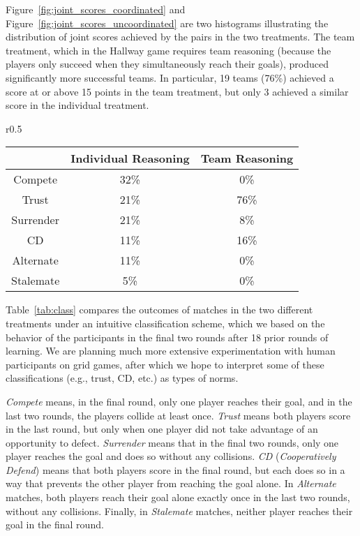 
Figure~\ref{fig:joint_scores_coordinated} and 
Figure~\ref{fig:joint_scores_uncoordinated} are two histograms illustrating the
distribution of joint scores achieved by the pairs in the two
treatments.  The team treatment, which in the Hallway game requires
team reasoning (because the players only succeed when they
simultaneously reach their goals), produced significantly more
successful teams.
%
In particular, 19 teams (76\%) achieved a score at or above 15 points
in the team treatment, but only 3 achieved a similar score in the
individual treatment.

\begin{wraptable}{r}{0.5\textwidth}
\begin{center}
\small{
\begin{tabular}{|c|c|c|}									   
\hline
			& Individual Reasoning              & Team Reasoning 	\\ \hline
 Compete		& 32\% 					& 0\% 			\\ \hline
 Trust		& 21\% 					& 76\% 			\\ \hline
 Surrender	& 21\% 					& 8\% 			\\ \hline
 CD			& 11\% 					& 16\% 			\\ \hline
 Alternate		& 11\% 					& 0\% 			\\ \hline
 Stalemate	& 5\% 					& 0\% 			\\ \hline
\end{tabular}}
\caption{A comparison between the strategies learned by pairs in the two treatments. 
These percentages represent $19$ games in the individual reasoning experiment,
and $25$ games in the team reasoning experiment.}
\label{tab:class}
\end{center}
\end{wraptable}

Table~\ref{tab:class} compares the outcomes of matches in the two
different treatments under an intuitive classification scheme, which
we based on the behavior of the participants in the final two rounds
after 18 prior rounds of learning.  We are planning much more
extensive experimentation with human participants on grid games, after
which we hope to interpret some of these classifications
(e.g., trust, CD, etc.) as types of norms.

\emph{Compete\/} means, in the final round, only one player reaches
their goal, and in the last two rounds, the players collide at least
once.  \emph{Trust\/} means both players score in the last round, but
only when one player did not take advantage of an opportunity to
defect.  \emph{Surrender\/} means that in the final two rounds, only
one player reaches the goal and does so without any collisions.
\emph{CD} (\emph{Cooperatively Defend}) means that both players score
in the final round, but each does so in a way that prevents the other
player from reaching the goal alone.  In \emph{Alternate} matches,
both players reach their goal alone exactly once in the last two
rounds, without any collisions.  Finally, in \emph{Stalemate} matches,
neither player reaches their goal in the final round.

